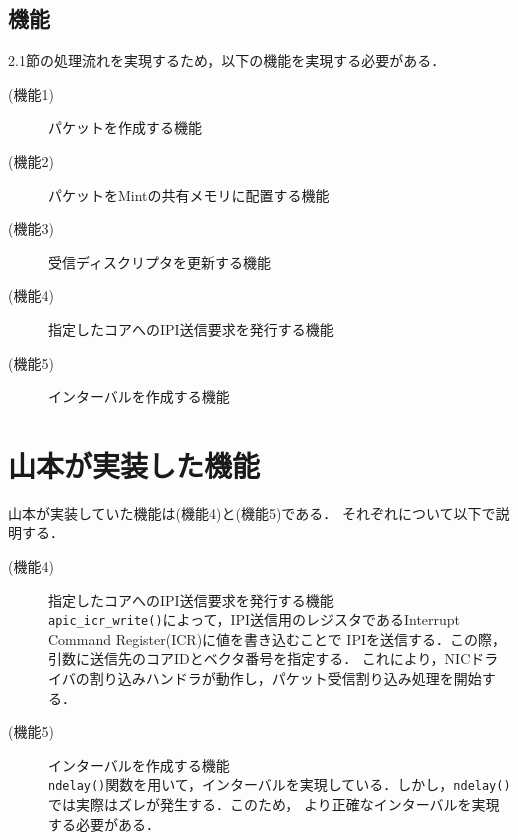 \documentclass[12pt]{jsarticle}
\begin{document}
\subsection{機能}
2.1節の処理流れを実現するため，以下の機能を実現する必要がある．
\begin{description}
    \item[(機能1)] パケットを作成する機能
    \item[(機能2)] パケットをMintの共有メモリに配置する機能
    \item[(機能3)] 受信ディスクリプタを更新する機能
    \item[(機能4)] 指定したコアへのIPI送信要求を発行する機能
    \item[(機能5)] インターバルを作成する機能
\end{description}

\section{山本が実装した機能}
山本が実装していた機能は(機能4)と(機能5)である．
それぞれについて以下で説明する．
\begin{description}
    \item[(機能4)]指定したコアへのIPI送信要求を発行する機能\\
        {\tt apic\_icr\_write()}によって，IPI送信用のレジスタであるInterrupt Command Register(ICR)に値を書き込むことで
        IPIを送信する．この際，引数に送信先のコアIDとベクタ番号を指定する．
        これにより，NICドライバの割り込みハンドラが動作し，パケット受信割り込み処理を開始する．
    \item[(機能5)]インターバルを作成する機能\\
        {\tt ndelay()}関数を用いて，インターバルを実現している．しかし，{\tt ndelay()}では実際はズレが発生する．このため，
        より正確なインターバルを実現する必要がある．
\end{description}
\end{document}
